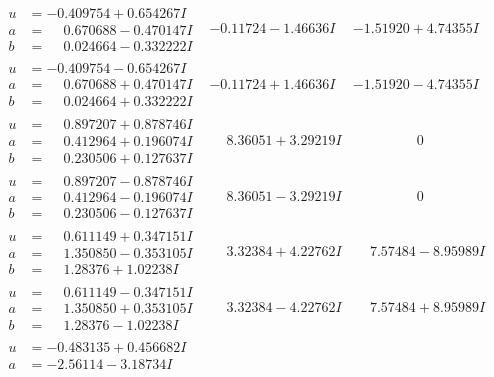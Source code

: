 \documentclass[1p]{elsarticle_modified}
\theoremstyle{definition}
\begin{document}
$$\begin{array}{c|c|c}
\begin{aligned}
u &= -0.409754 + 0.654267 I \\
a &= \phantom{-}0.670688 - 0.470147 I \\
b &= \phantom{-}0.024664 - 0.332222 I\end{aligned}
 & -0.11724 - 1.46636 I & -1.51920 + 4.74355 I \\ \hline\begin{aligned}
u &= -0.409754 - 0.654267 I \\
a &= \phantom{-}0.670688 + 0.470147 I \\
b &= \phantom{-}0.024664 + 0.332222 I\end{aligned}
 & -0.11724 + 1.46636 I & -1.51920 - 4.74355 I \\ \hline\begin{aligned}
u &= \phantom{-}0.897207 + 0.878746 I \\
a &= \phantom{-}0.412964 + 0.196074 I \\
b &= \phantom{-}0.230506 + 0.127637 I\end{aligned}
 & \phantom{-}8.36051 + 3.29219 I & \phantom{-0.000000 } 0 \\ \hline\begin{aligned}
u &= \phantom{-}0.897207 - 0.878746 I \\
a &= \phantom{-}0.412964 - 0.196074 I \\
b &= \phantom{-}0.230506 - 0.127637 I\end{aligned}
 & \phantom{-}8.36051 - 3.29219 I & \phantom{-0.000000 } 0 \\ \hline\begin{aligned}
u &= \phantom{-}0.611149 + 0.347151 I \\
a &= \phantom{-}1.350850 - 0.353105 I \\
b &= \phantom{-}1.28376 + 1.02238 I\end{aligned}
 & \phantom{-}3.32384 + 4.22762 I & \phantom{-}7.57484 - 8.95989 I \\ \hline\begin{aligned}
u &= \phantom{-}0.611149 - 0.347151 I \\
a &= \phantom{-}1.350850 + 0.353105 I \\
b &= \phantom{-}1.28376 - 1.02238 I\end{aligned}
 & \phantom{-}3.32384 - 4.22762 I & \phantom{-}7.57484 + 8.95989 I \\ \hline\begin{aligned}
u &= -0.483135 + 0.456682 I \\
a &= -2.56114 - 3.18734 I \\

\end{aligned}
\end{array}$$
\end{document}
